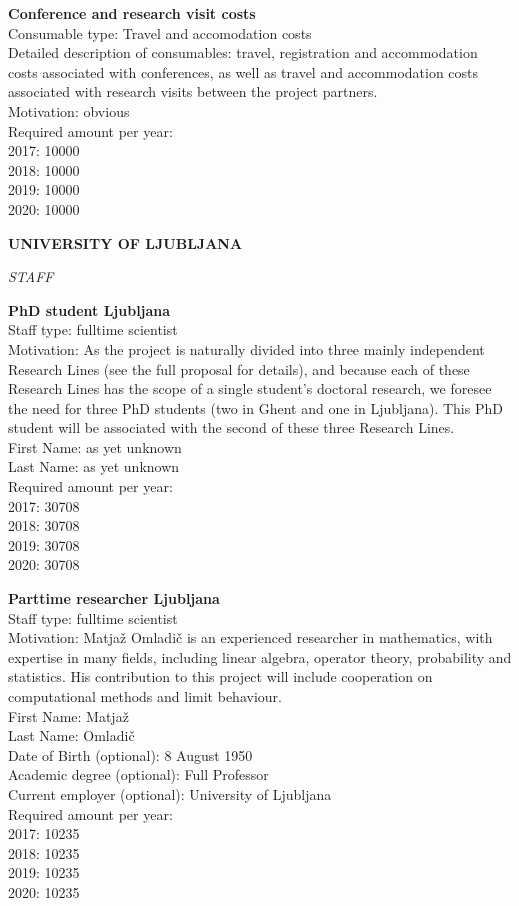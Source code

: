 \documentclass[11pt,dvipsnames,usenames,a4paper]{article}
\begin{document}
{\bf Conference and research visit costs}\\
Consumable type: Travel and accomodation costs\\
Detailed description of consumables: travel, registration and accommodation costs associated with conferences, as well as travel and accommodation costs associated with research visits between the project partners.\\
Motivation: obvious\\
Required amount per year:\\
2017: 10000\\
2018: 10000\\
2019: 10000\\
2020: 10000


{\bf UNIVERSITY OF LJUBLJANA}

{\it STAFF}

\textbf{PhD student Ljubljana} \\
Staff type: fulltime scientist\\
Motivation: As the project is naturally divided into three mainly independent Research Lines (see the full proposal for details), and because each of these Research Lines has the scope of a single student's doctoral research, we foresee the need for three PhD students (two in Ghent and one in Ljubljana). This PhD student will be associated with the second of these three Research Lines.\\
First Name: as yet unknown\\
Last Name: as yet unknown\\
Required amount per year:\\
2017: 30708\\
2018: 30708\\
2019: 30708\\
2020: 30708

\textbf{Parttime researcher Ljubljana}\\
Staff type: fulltime scientist\\
Motivation: Matja\v{z} Omladi\v{c} is an experienced researcher in mathematics, with expertise in many fields, including linear algebra, operator theory, probability and statistics. His contribution to this project will include cooperation on computational methods and limit behaviour.\\
First Name: Matja\v{z}\\
Last Name: Omladi\v{c}\\
Date of Birth (optional): 8 August 1950\\
Academic degree (optional): Full Professor\\
Current employer (optional): University of Ljubljana\\
Required amount per year:\\
2017: 10235\\
2018: 10235\\
2019: 10235\\
2020: 10235
\end{document}
